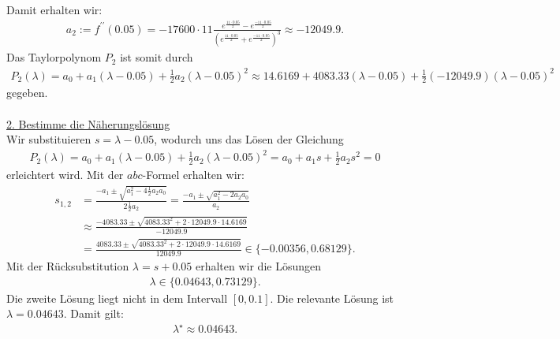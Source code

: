 Damit erhalten wir:
\begin{align*}
	a_2
	:=
	f^{\prime \prime}(0.05)
	=
	-17600 \cdot 11 
	\frac{e^{\frac{11 \cdot 0.05}{2}} 
		-  e^{\frac{-11 \cdot 0.05}{2}}
	}{
		\left( e^{\frac{11 \cdot 0.05}{2}} + e^{\frac{-11 \cdot 0.05}{2}} \right)^3
	}
	\approx 
	-12049.9.
\end{align*}
Das Taylorpolynom $P_2$ ist somit durch 
\begin{align*}
	P_2(\lambda)
	= 
	a_0 
	+ 
	a_1(\lambda - 0.05)
	+
	\frac{1}{2}
	a_2 
	(\lambda - 0.05)^2 	
	\approx
	14.6169
	+
	4083.33
	(\lambda - 0.05)
	+
	\frac{1}{2}
	(-12049.9) (\lambda - 0.05)^2
\end{align*}
gegeben.\\
\\
\underline{2. Bestimme die Näherungslösung}\\
Wir substituieren $s = \lambda - 0.05$, wodurch uns das Lösen der Gleichung
\begin{align*}
	P_2(\lambda) = a_0 
	+ 
	a_1(\lambda - 0.05)
	+
	\frac{1}{2}
	a_2 
	(\lambda - 0.05)^2 	
	=
	a_0 + a_1 s +\frac{1}{2} a_2 s^2 = 0
\end{align*}
erleichtert wird. Mit der $abc$-Formel erhalten wir:
\begin{align*}
	s_{1,2}
	&=
	\frac{-a_1 \pm \sqrt{a_1^2 - 4 \frac{1}{2} a_2 a_0}}{2 \frac{1}{2} a_2}
	=
	\frac{-a_1 \pm \sqrt{a_1^2 - 2  a_2 a_0}}{ a_2} \\
	&\approx
	\frac{-4083.33 \pm \sqrt{4083.33^2 + 2 \cdot 12049.9 \cdot 14.6169}}{-12049.9}\\
	&=
	\frac{4083.33 \pm \sqrt{4083.33^2 + 2 \cdot 12049.9 \cdot 14.6169}}{12049.9}
	\in 
	\{ -0.00356, 0.68129\}.
\end{align*}
Mit der Rücksubstitution $\lambda = s + 0.05$ erhalten wir die Lösungen 
\begin{align*}
	\lambda
	\in 
	\{
	0.04643,0.73129
	\}.
\end{align*}
Die zweite Lösung liegt nicht in dem Intervall $[0,0.1]$. Die relevante Lösung ist $\lambda = 0.04643$. Damit gilt:
\begin{align*}
	\lambda^\star
	\approx
	0.04643.
\end{align*}
\newpage
